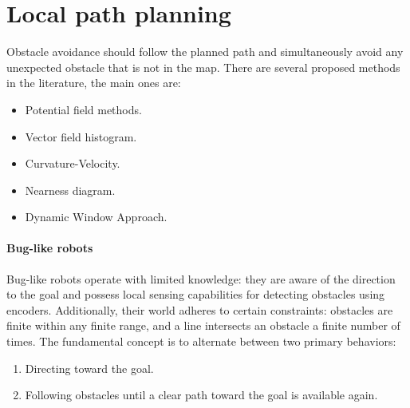 \section{Local path planning}

Obstacle avoidance should follow the planned path and simultaneously avoid any unexpected obstacle that is not in the map.
There are several proposed methods in the literature, the main ones are: 
\begin{itemize}
    \item Potential field methods.
    \item Vector field histogram.
    \item Curvature-Velocity.
    \item Nearness diagram.
    \item Dynamic Window Approach.
\end{itemize}

\paragraph*{Bug-like robots}
Bug-like robots operate with limited knowledge: they are aware of the direction to the goal and possess local sensing capabilities for detecting obstacles using encoders.
Additionally, their world adheres to certain constraints: obstacles are finite within any finite range, and a line intersects an obstacle a finite number of times. 
The fundamental concept is to alternate between two primary behaviors:
\begin{enumerate}
    \item Directing toward the goal.
    \item Following obstacles until a clear path toward the goal is available again.
\end{enumerate}


